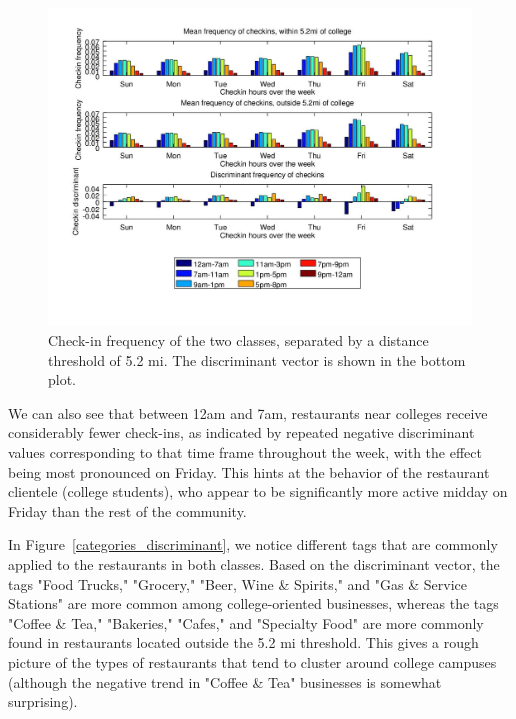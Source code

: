 \documentclass[10pt,twocolumn,letterpaper]{article}
\begin{document}
\begin{figure}[h]
  \centering{}\includegraphics[width=1\linewidth]{filtered_colleges_yes_subtopics/checkins_discriminant}
  \caption{Check-in frequency of the two classes, separated by a distance
    threshold of 5.2 mi. The discriminant vector is shown in the bottom plot.}
\label{checkins_discriminant}
\end{figure}

We can also see that between 12am and 7am, restaurants near colleges receive
considerably fewer check-ins, as indicated by repeated negative discriminant
values corresponding to that time frame throughout the week, with the effect
being most pronounced on Friday. This hints at the behavior of the restaurant
clientele (college students), who appear to be significantly more active midday
on Friday than the rest of the community.

In Figure~\ref{categories_discriminant}, we notice different tags that are
commonly applied to the restaurants in both classes. Based on the discriminant
vector, the tags "Food Trucks," "Grocery," "Beer, Wine \& Spirits," and "Gas \&
Service Stations" are more common among college-oriented businesses, whereas the
tags "Coffee \& Tea," "Bakeries," "Cafes," and "Specialty Food" are more commonly
found in restaurants located outside the 5.2 mi threshold. This gives a rough
picture of the types of restaurants that tend to cluster around college
campuses (although the negative trend in "Coffee \& Tea" businesses is somewhat
surprising).
\end{document}
